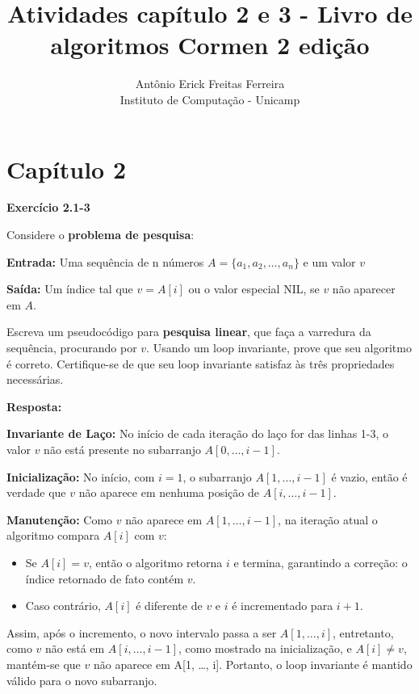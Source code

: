 \documentclass{article}
\title{Atividades capítulo 2 e 3 - Livro de algoritmos Cormen 2 edição}
\author{Antônio Erick Freitas Ferreira \\
        \small Instituto de Computação - Unicamp
}
\begin{document}
\maketitle

\section*{Capítulo 2}
    \textbf{Exercício 2.1-3} 
    
    Considere o \textbf{problema de pesquisa}:
    
    \textbf{Entrada:} Uma sequência de n números $A = \{a_1, a_2, \dots, a_n\}$ e um valor $v$
    
    \textbf{Saída:} Um índice tal que $v = A[i]$ ou o valor especial NIL, se $v$ não aparecer em $A$.
    
    Escreva um pseudocódigo para \textbf{pesquisa linear}, que faça a varredura da sequência, procurando por $v$. Usando um loop invariante, prove que seu algoritmo é correto. Certifique-se de que seu loop invariante satisfaz às três propriedades necessárias.
    
    \textbf{Resposta:}
    
    \begin{algorithm}[H]
        \caption{Pesquisa Linear}
        \label{pesquisa-linear}

    \end{algorithm}
    
    \textbf{Invariante de Laço:} No início de cada iteração do laço for das linhas 1-3, o valor $v$ não está presente no subarranjo $A[0,\dots,i-1]$.

    \textbf{Inicialização:} No início, com $i = 1$, o subarranjo $A[1, \dots, i-1]$ é vazio, então é verdade que $v$ não aparece em nenhuma posição de $A[i, \dots, i-1]$.

    \textbf{Manutenção:} Como $v$ não aparece em $A[1, \dots, i-1]$, na iteração atual o algoritmo compara $A[i]$ com $v$:
    \begin{itemize}
        \item Se $A[i] = v$, então o algoritmo retorna $i$ e termina, garantindo a correção: o índice retornado de fato contém $v$.
        \item Caso contrário, $A[i]$ é diferente de $v$ e $i$ é incrementado para $i + 1$.
     \end{itemize}
    Assim, após o incremento, o novo intervalo passa a ser $A[1, \dots, i]$, entretanto, como $v$ não está em $A[i, \dots, i-1]$, como mostrado na inicialização, e $A[i] \neq v$, mantém-se que $v$ não aparece em A[1, \dots, i]. Portanto, o loop invariante é mantido válido para o novo subarranjo.
\end{document}
